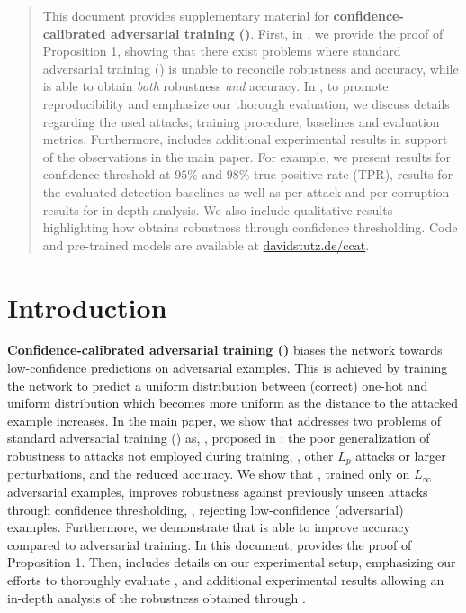
\vskip 0.3in

\begin{abstract}
    This document provides supplementary material for \textbf{confidence-calibrated adversarial training (\ConfTrain)}. First, in , we provide the proof of Proposition 1, showing that there exist problems where standard adversarial training (\AdvTrain) is unable to reconcile robustness and accuracy, while \ConfTrain is able to obtain \emph{both} robustness \emph{and} accuracy. In , to promote reproducibility and emphasize our thorough evaluation, we discuss details regarding the used attacks, training procedure, baselines and evaluation metrics. Furthermore,  includes additional experimental results in support of the observations in the main paper. For example, we present results for confidence threshold at $95\%$ and $98\%$ true positive rate (TPR), results for the evaluated detection baselines as well as per-attack and per-corruption results for in-depth analysis. We also include qualitative results highlighting how \ConfTrain obtains robustness through confidence thresholding. Code and pre-trained models are available at \href{http://davidstutz.de/ccat}{davidstutz.de/ccat}.
\end{abstract}

\section{Introduction}

\textbf{Confidence-calibrated adversarial training (\ConfTrain)} biases the network towards low-confidence predictions on adversarial examples. This is achieved by training the network to predict a uniform distribution between (correct) one-hot and uniform distribution which becomes more uniform as the distance to the attacked example increases. In the main paper, we show that \ConfTrain addresses two problems of standard adversarial training (\AdvTrain) as, \eg, proposed in \cite{MadryICLR2018}: the poor generalization of robustness to attacks not employed during training, \eg, other $L_p$ attacks or larger perturbations, and the reduced accuracy. We show that \ConfTrain, trained only on $L_\infty$ adversarial examples, improves robustness against previously unseen attacks through confidence thresholding, \ie, rejecting low-confidence (adversarial) examples. Furthermore, we demonstrate that \ConfTrain is able to improve accuracy compared to adversarial training. In this document,  provides the proof of Proposition 1. Then,  includes details on our experimental setup, emphasizing our efforts to thoroughly evaluate \ConfTrain, and additional experimental results allowing an in-depth analysis of the robustness obtained through \ConfTrain.

